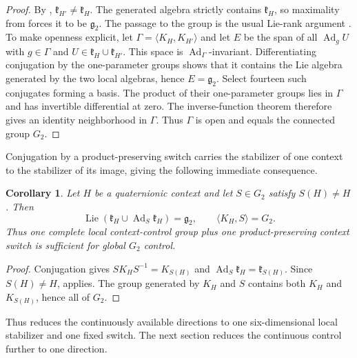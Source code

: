 \documentclass[11pt,a4paper]{article}
\newtheorem{corollary}[corollary]{Corollary}
\newcommand{\Lie}{\operatorname{Lie}}
\newcommand{\Ad}{\operatorname{Ad}}
\begin{document}
\begin{proof}
By , $\mathfrak k_{H'}\ne\mathfrak k_H$.  The generated algebra strictly contains $\mathfrak k_H$, so maximality from  forces it to be $\mathfrak g_2$.  The passage to the group is the usual Lie-rank argument \cite{JurdjevicSussmann1972}.  To make openness explicit, let $\Gamma=\langle K_H,K_{H'}\rangle$ and let $E$ be the span of all $\Ad_g U$ with $g\in\Gamma$ and $U\in\mathfrak k_H\cup\mathfrak k_{H'}$.  This space is $\Ad_\Gamma$-invariant.  Differentiating conjugation by the one-parameter groups shows that it contains the Lie algebra generated by the two local algebras, hence $E=\mathfrak g_2$.  Select fourteen such conjugates forming a basis.  The product of their one-parameter groups lies in $\Gamma$ and has invertible differential at zero.  The inverse-function theorem therefore gives an identity neighborhood in $\Gamma$.  Thus $\Gamma$ is open and equals the connected group $G_2$.
\end{proof}

Conjugation by a product-preserving switch carries the stabilizer of one context to the stabilizer of its image, giving the following immediate consequence.

\begin{corollary}
\label{cor:stabilizer-switch}
Let $H$ be a quaternionic context and let $S\in G_2$ satisfy $S(H)\neq H$.  Then
\[
\Lie\!\left(\mathfrak k_H\cup\Ad_S\mathfrak k_H\right)=\mathfrak g_2,
\qquad
\langle K_H,S\rangle=G_2.
\]
Thus one complete local context-control group plus one product-preserving context switch is sufficient for global $G_2$ control.
\end{corollary}

\begin{proof}
Conjugation gives $SK_HS^{-1}=K_{S(H)}$ and
$\Ad_S\mathfrak k_H=\mathfrak k_{S(H)}$.  Since $S(H)\neq H$,  applies.  The group generated by $K_H$ and $S$ contains both $K_H$ and $K_{S(H)}$, hence all of $G_2$.
\end{proof}

Thus  reduces the continuously available directions to one six-dimensional local stabilizer and one fixed switch.  The next section reduces the continuous control further to one direction.
\end{document}
